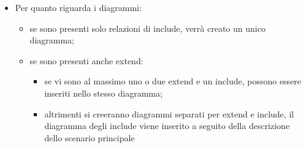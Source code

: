 \documentclass[a4paper, 11pt]{article}
\begin{document}
\begin{itemize}
\begin{itemize}
\begin{itemize}
        \end{itemize}
        \item Inclusioni: inserimento solo del riferimento al caso d'uso incluso, usando label\{UCx\} e hyperref[UCx]\{Titolo link\}
        \item Estensioni: inserimento solo del riferimento al caso d'uso di estensione
        \item Eredita da/UC che ereditano: in caso di generalizzazione 
        \begin{itemize}
            \item nel caso padre: si mette UC che ereditano a seguito di cui si indicano i casi d'uso che ereditano;
            \item nei casi figli: si mette eredita da seguito dal riferimento al caso d'uso padre.
        \end{itemize} 
    \end{itemize}
    \item Per quanto riguarda i diagrammi:
    \begin{itemize}
        \item se sono presenti solo relazioni di include, verrà creato un unico diagramma;
        \item se sono presenti anche extend:
        \begin{itemize}
            \item se vi sono al massimo uno o due extend e un include, possono essere inseriti nello stesso diagramma;
            \item altrimenti si creeranno diagrammi separati per extend e include, il diagramma degli include viene inserito a seguito della descrizione dello scenario principale
        \end{itemize}
    \end{itemize}
\end{itemize}
\end{document}
